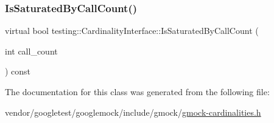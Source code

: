 \subsubsection{\texorpdfstring{Is\+Saturated\+By\+Call\+Count()}{IsSaturatedByCallCount()}}
{\footnotesize\ttfamily virtual bool testing\+::\+Cardinality\+Interface\+::\+Is\+Saturated\+By\+Call\+Count (\begin{DoxyParamCaption}\item[{int}]{call\+\_\+count }\end{DoxyParamCaption}) const\hspace{0.3cm}{\ttfamily [pure virtual]}}



The documentation for this class was generated from the following file\+:\begin{DoxyCompactItemize}
\item 
vendor/googletest/googlemock/include/gmock/\hyperlink{gmock-cardinalities_8h}{gmock-\/cardinalities.\+h}\end{DoxyCompactItemize}
